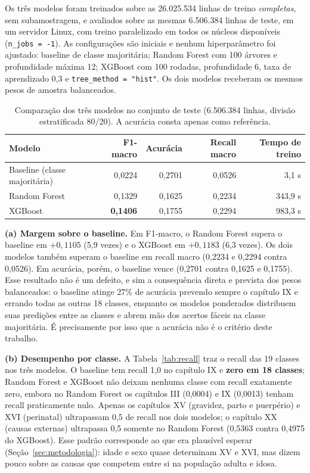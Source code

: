 \documentclass[12pt]{article}
\begin{document}
Os três modelos foram treinados sobre as 26.025.534 linhas de treino
\emph{completas}, sem subamostragem, e avaliados sobre as mesmas 6.506.384
linhas de teste, em um servidor Linux, com treino paralelizado em todos os
núcleos disponíveis (\texttt{n\_jobs = -1}). As configurações são iniciais e
nenhum hiperparâmetro foi ajustado: baseline de
classe majoritária; Random Forest com 100 árvores e profundidade máxima 12;
XGBoost com 100 rodadas, profundidade 6, taxa de aprendizado 0,3 e
\texttt{tree\_method = "hist"}. Os dois modelos receberam os mesmos pesos de
amostra balanceados.

\begin{table}[ht]
\centering
\caption{Comparação dos três modelos no conjunto de teste (6.506.384 linhas,
  divisão estratificada 80/20). A acurácia consta apenas como referência.}
\label{tab:comparacao}
\small
\begin{tabular}{|l|r|r|r|r|}
\hline
\textbf{Modelo} & \textbf{F1-macro} & \textbf{Acurácia} & \textbf{Recall macro}
  & \textbf{Tempo de treino} \\
\hline
Baseline (classe majoritária) & 0,0224 & 0,2701 & 0,0526 &     3,1 s \\
Random Forest                 & 0,1329 & 0,1625 & 0,2234 &   343,9 s \\
XGBoost                       & \textbf{0,1406} & 0,1755 & 0,2294 &   983,3 s \\
\hline
\end{tabular}
\end{table}

\textbf{(a) Margem sobre o baseline.} Em F1-macro, o Random Forest supera o
baseline em $+0{,}1105$ (5,9 vezes) e o XGBoost em $+0{,}1183$ (6,3 vezes). Os
dois modelos também superam o baseline em recall macro (0,2234 e 0,2294 contra
0,0526). Em acurácia, porém, o baseline vence (0,2701 contra 0,1625 e 0,1755).
Esse resultado não é um defeito, e sim a consequência direta e prevista dos
pesos balanceados: o baseline atinge 27\% de acurácia prevendo sempre o
capítulo IX e errando todas as outras 18 classes, enquanto os modelos
ponderados distribuem suas predições entre as classes e abrem mão dos acertos
fáceis na classe majoritária. É precisamente por isso que a acurácia não é o
critério deste trabalho.

\textbf{(b) Desempenho por classe.} A Tabela~\ref{tab:recall} traz o recall
das 19 classes nos três modelos. O baseline tem recall 1,0 no capítulo IX e
\textbf{zero em 18 classes}; Random Forest e XGBoost não deixam nenhuma classe
com recall exatamente zero, embora no Random Forest os capítulos III (0,0004)
e IX (0,0013) tenham recall praticamente nulo. Apenas os capítulos XV
(gravidez, parto e puerpério) e XVI (perinatal) ultrapassam 0,5 de recall nos
dois modelos; o capítulo XX (causas externas) ultrapassa 0,5 somente no Random
Forest (0,5363 contra 0,4975 do XGBoost). Esse padrão corresponde ao que era
plausível esperar (Seção~\ref{sec:metodologia}): idade e sexo quase determinam XV e
XVI, mas dizem pouco sobre as causas que competem entre si na população adulta
e idosa.
\end{document}
